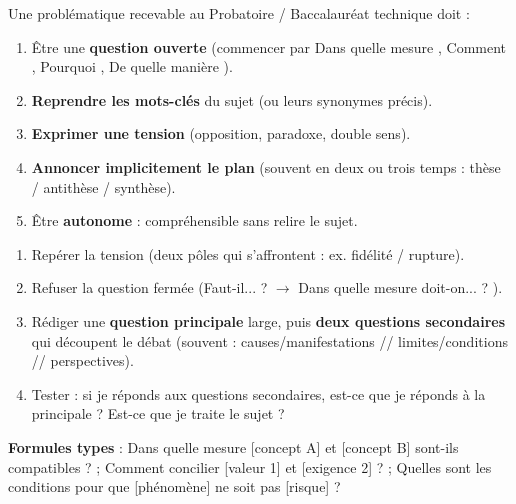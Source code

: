 \documentclass[11pt]{article}
\newcommand{\cle}[1]{{\popxbold\color{popdark}#1}}
\begin{document}
\begin{propriete}
Une problématique recevable au Probatoire / Baccalauréat technique doit :
\begin{enumerate}
\item Être une \textbf{question ouverte} (commencer par \og Dans quelle mesure \fg, \og Comment \fg, \og Pourquoi \fg, \og De quelle manière \fg).
\item \textbf{Reprendre les mots-clés} du sujet (ou leurs synonymes précis).
\item \textbf{Exprimer une tension} (opposition, paradoxe, double sens).
\item \textbf{Annoncer implicitement le plan} (souvent en deux ou trois temps : thèse / antithèse / synthèse).
\item Être \textbf{autonome} : compréhensible sans relire le sujet.
\end{enumerate}
\end{propriete}

\begin{methode}
\begin{enumerate}
\item Repérer la \cle{tension} (deux pôles qui s'affrontent : ex. fidélité / rupture).
\item Refuser la question fermée (\og Faut-il... ? \fg $\rightarrow$ \og Dans quelle mesure doit-on... ? \fg).
\item Rédiger une \textbf{question principale} large, puis \textbf{deux questions secondaires} qui découpent le débat (souvent : causes/manifestations // limites/conditions // perspectives).
\item Tester : si je réponds aux questions secondaires, est-ce que je réponds à la principale ? Est-ce que je traite le sujet ?
\end{enumerate}
\textbf{Formules types} : \og Dans quelle mesure [concept A] et [concept B] sont-ils compatibles ? \fg ; \og Comment concilier [valeur 1] et [exigence 2] ? \fg ; \og Quelles sont les conditions pour que [phénomène] ne soit pas [risque] ? \fg
\end{methode}
\end{document}

